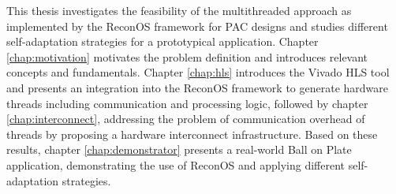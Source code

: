 This thesis investigates the feasibility of the multithreaded approach as
implemented by the ReconOS framework for \ac{PAC} designs and studies
different self-adaptation strategies for a prototypical application. Chapter
\ref{chap:motivation} motivates the problem definition and introduces relevant
concepts and fundamentals. Chapter \ref{chap:hls} introduces the Vivado HLS
tool and presents an integration into the ReconOS framework to generate
hardware threads including communication and processing logic, followed by
chapter \ref{chap:interconnect}, addressing the problem of communication
overhead of threads by proposing a hardware interconnect infrastructure. Based
on these results, chapter \ref{chap:demonstrator} presents a real-world Ball
on Plate application, demonstrating the use of ReconOS and applying different
self-adaptation strategies.